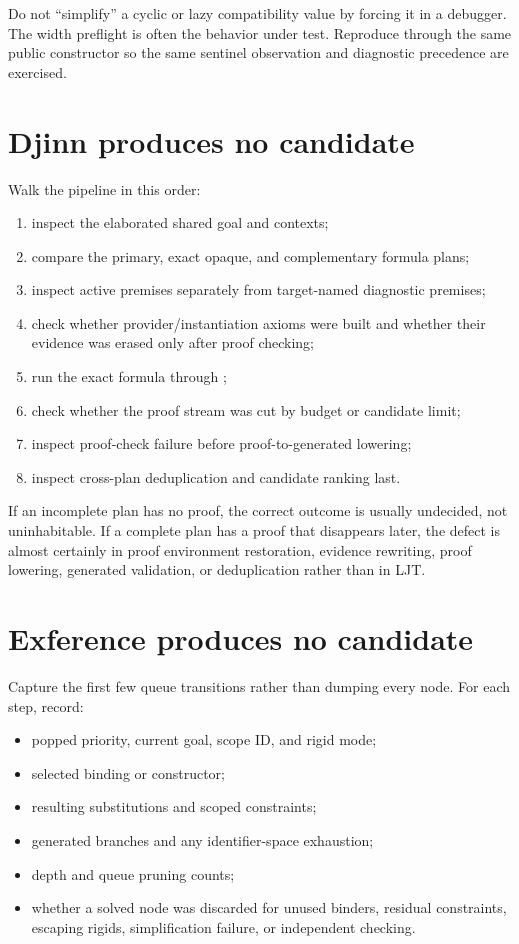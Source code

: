 \documentclass[10pt,letterpaper,oneside]{report}
\newcommand{\code}[1]{\texttt{\detokenize{#1}}}
\begin{document}
Do not ``simplify'' a cyclic or lazy compatibility value by forcing it in a debugger. The width preflight is often the behavior under test. Reproduce through the same public constructor so the same sentinel observation and diagnostic precedence are exercised.

\section{Djinn produces no candidate}

Walk the pipeline in this order:

\begin{enumerate}
  \item inspect the elaborated shared goal and contexts;
  \item compare the primary, exact opaque, and complementary formula plans;
  \item inspect active premises separately from target-named diagnostic premises;
  \item check whether provider/instantiation axioms were built and whether their evidence was erased only after proof checking;
  \item run the exact formula through \code{proveWithModeChecked};
  \item check whether the proof stream was cut by budget or candidate limit;
  \item inspect proof-check failure before proof-to-generated lowering;
  \item inspect cross-plan deduplication and candidate ranking last.
\end{enumerate}

If an incomplete plan has no proof, the correct outcome is usually undecided, not uninhabitable. If a complete plan has a proof that disappears later, the defect is almost certainly in proof environment restoration, evidence rewriting, proof lowering, generated validation, or deduplication rather than in LJT.

\section{Exference produces no candidate}

Capture the first few queue transitions rather than dumping every node. For each step, record:

\begin{itemize}
  \item popped priority, current goal, scope ID, and rigid mode;
  \item selected binding or constructor;
  \item resulting substitutions and scoped constraints;
  \item generated branches and any identifier-space exhaustion;
  \item depth and queue pruning counts;
  \item whether a solved node was discarded for unused binders, residual constraints, escaping rigids, simplification failure, or independent checking.
\end{itemize}
\end{document}
